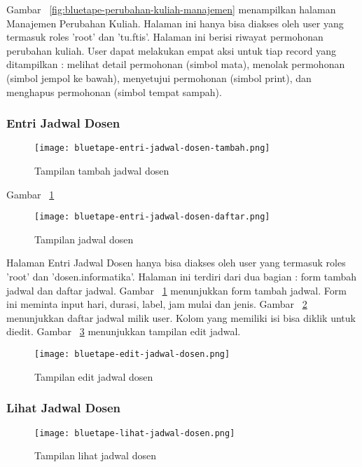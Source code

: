	Gambar~ \ref{fig:bluetape-perubahan-kuliah-manajemen} menampilkan halaman Manajemen Perubahan Kuliah. Halaman ini hanya bisa diakses oleh user yang termasuk roles 'root' dan 'tu.ftis'. Halaman ini berisi riwayat permohonan perubahan kuliah. User dapat melakukan empat aksi untuk tiap record yang ditampilkan : melihat detail permohonan (simbol mata), menolak permohonan (simbol jempol ke bawah), menyetujui permohonan (simbol print), dan menghapus permohonan (simbol tempat sampah).
	
	\subsubsection{Entri Jadwal Dosen}
	\begin{figure}[H]
		\centering  
		\texttt{[image: bluetape-entri-jadwal-dosen-tambah.png]}  
		\caption[Tampilan tambah jadwal dosen]{Tampilan tambah jadwal dosen} 
		\label{fig:bluetape-entri-jadwal-dosen-tambah} 
	\end{figure}
	
	Gambar~ \ref{fig:bluetape-entri-jadwal-dosen-tambah}
	\begin{figure}[H]
		\centering  
		\texttt{[image: bluetape-entri-jadwal-dosen-daftar.png]}  
		\caption[Tampilan jadwal dosen]{Tampilan jadwal dosen} 
		\label{fig:bluetape-entri-jadwal-dosen-daftar} 
	\end{figure}
	
	Halaman Entri Jadwal Dosen hanya bisa diakses oleh user yang termasuk roles 'root' dan 'dosen.informatika'. Halaman ini terdiri dari dua bagian : form tambah jadwal dan daftar jadwal. Gambar~ \ref{fig:bluetape-entri-jadwal-dosen-tambah} menunjukkan form tambah jadwal. Form ini meminta input hari, durasi, label, jam mulai dan jenis. Gambar~ \ref{fig:bluetape-entri-jadwal-dosen-daftar} menunjukkan daftar jadwal milik user. Kolom yang memiliki isi bisa diklik untuk diedit. Gambar~ \ref{fig:bluetape-edit-jadwal-dosen} menunjukkan tampilan edit jadwal.
	
	\begin{figure}[H]
		\centering  
		\texttt{[image: bluetape-edit-jadwal-dosen.png]}  
		\caption[Tampilan edit jadwal dosen]{Tampilan edit jadwal dosen} 
		\label{fig:bluetape-edit-jadwal-dosen} 
	\end{figure}

	\subsubsection{Lihat Jadwal Dosen}
	\begin{figure}[H]
		\centering  
		\texttt{[image: bluetape-lihat-jadwal-dosen.png]}  
		\caption[Tampilan lihat jadwal dosen]{Tampilan lihat jadwal dosen} 
		\label{fig:bluetape-lihat-jadwal-dosen} 
	\end{figure}
	
